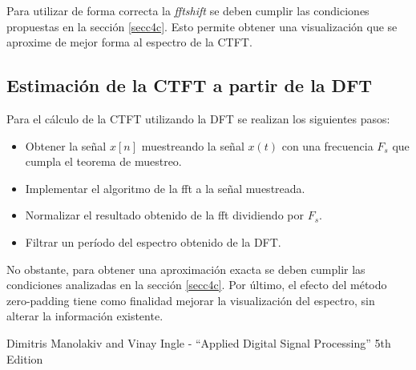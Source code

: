 \documentclass[11pt,a4paper]{article}
\begin{document}
Para utilizar de forma correcta la \textit{fftshift} se deben cumplir las condiciones propuestas en la sección \ref{secc4c}. Esto permite obtener una visualización que se aproxime de mejor 
forma al espectro de la CTFT.


 \subsection{Estimación de la CTFT a partir de la DFT}
 Para el cálculo de la CTFT utilizando la DFT se realizan los siguientes pasos:
 \begin{itemize}
     \item Obtener la señal $x[n]$ muestreando la señal $x(t)$ con una frecuencia $F_s$ que cumpla el teorema de muestreo.
     \item Implementar el algoritmo de la fft a la señal muestreada.
     \item Normalizar el resultado obtenido de la fft dividiendo por $F_s$.
     \item Filtrar un período del espectro obtenido de la DFT.
 \end{itemize}

No obstante, para obtener una aproximación exacta se deben cumplir las condiciones analizadas en la sección \ref{secc4c}.
Por último, el efecto del método zero-padding tiene como finalidad mejorar la visualización del espectro, sin alterar la información existente.


\begin{thebibliography}{0}
    Dimitris Manolakiv and Vinay Ingle - ``Applied Digital Signal Processing'' 5th Edition
\end{thebibliography}
\end{document}
